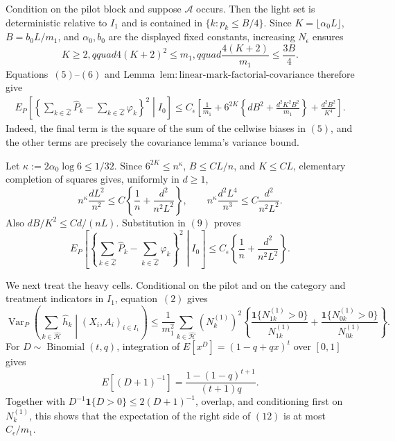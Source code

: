 Condition on the pilot block and suppose \(\mathcal A\) occurs.  Then the light set is deterministic relative to \(I_1\) and is contained in \(\{k:p_k\le B/4\}\).  Since \(K=\lfloor\alpha_0L\rfloor\), \(B=b_0L/m_1\), and \(\alpha_0,b_0\) are the displayed fixed constants, increasing \(N_{\epsilon}\) ensures
\[
 K\ge2,qquad 4(K+2)^2\le m_1,qquad
 \frac{4(K+2)}{m_1}\le\frac{3B}{4}.
\tag{8}
\]
Equations~\((5)\)--\((6)\) and Lemma~\(\mathrm{lem:linear\text{-}mark\text{-}factorial\text{-}covariance}\) therefore give
\[
\begin{split}
 E_P\left[\left\{
 \sum_{k\in\widehat{\mathcal L}}\widehat P_k-
 \sum_{k\in\widehat{\mathcal L}}\varphi_k
 \right\}^2\middle|I_0\right]
 \le C_{\epsilon}\left[
 \frac1{m_1}+6^{2K}\left\{dB^2+
 \frac{d^2K^2B^2}{m_1}\right\}
 +\frac{d^2B^2}{K^4}
 \right].
\end{split}
\tag{9}
\]
Indeed, the final term is the square of the sum of the cellwise biases in \((5)\), and the other terms are precisely the covariance lemma's variance bound.

Let \(\kappa:=2\alpha_0\log6\le1/32\).  Since \(6^{2K}\le n^\kappa\), \(B\le CL/n\), and \(K\le CL\), elementary completion of squares gives, uniformly in \(d\ge1\),
\[
 n^\kappa\frac{dL^2}{n^2}
 \le C\left\{\frac1n+\frac{d^2}{n^2L^2}\right\},
 \qquad
 n^\kappa\frac{d^2L^4}{n^3}
 \le C\frac{d^2}{n^2L^2}.
\tag{10}
\]
Also \(dB/K^2\le Cd/(nL)\).  Substitution in \((9)\) proves
\[
 E_P\left[\left\{
 \sum_{k\in\widehat{\mathcal L}}\widehat P_k-
 \sum_{k\in\widehat{\mathcal L}}\varphi_k
 \right\}^2\middle|I_0\right]
 \le C_{\epsilon}\left\{\frac1n+
 \frac{d^2}{n^2L^2}\right\}.
\tag{11}
\]

We next treat the heavy cells.  Conditional on the pilot and on the category and treatment indicators in \(I_1\), equation~\((2)\) gives
\[
 \operatorname{Var}_P\left(
 \sum_{k\in\widehat{\mathcal H}}\widehat h_k
 \middle|(X_i,A_i)_{i\in I_1}\right)
 \le\frac1{m_1^2}\sum_{k\in\widehat{\mathcal H}}(N_k^{(1)})^2
 \left\{
 \frac{\mathbf1\{N_{1k}^{(1)}>0\}}{N_{1k}^{(1)}}+
 \frac{\mathbf1\{N_{0k}^{(1)}>0\}}{N_{0k}^{(1)}}
 \right\}.
\tag{12}
\]
For \(D\sim\operatorname{Binomial}(t,q)\), integration of \(E[x^D]=(1-q+qx)^t\) over \([0,1]\) gives
\[
 E[(D+1)^{-1}]=\frac{1-(1-q)^{t+1}}{(t+1)q}.
\]
Together with \(D^{-1}\mathbf1\{D>0\}\le2(D+1)^{-1}\), overlap, and conditioning first on \(N_k^{(1)}\), this shows that the expectation of the right side of \((12)\) is at most \(C_{\epsilon}/m_1\).

